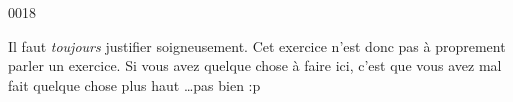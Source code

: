 
\begin{corrige}{0018}

Il faut \emph{toujours} justifier soigneusement. Cet exercice n'est donc pas à proprement parler un exercice. Si vous avez quelque chose à faire ici, c'est que vous avez mal fait quelque chose plus haut \ldots pas bien :p

\end{corrige}

